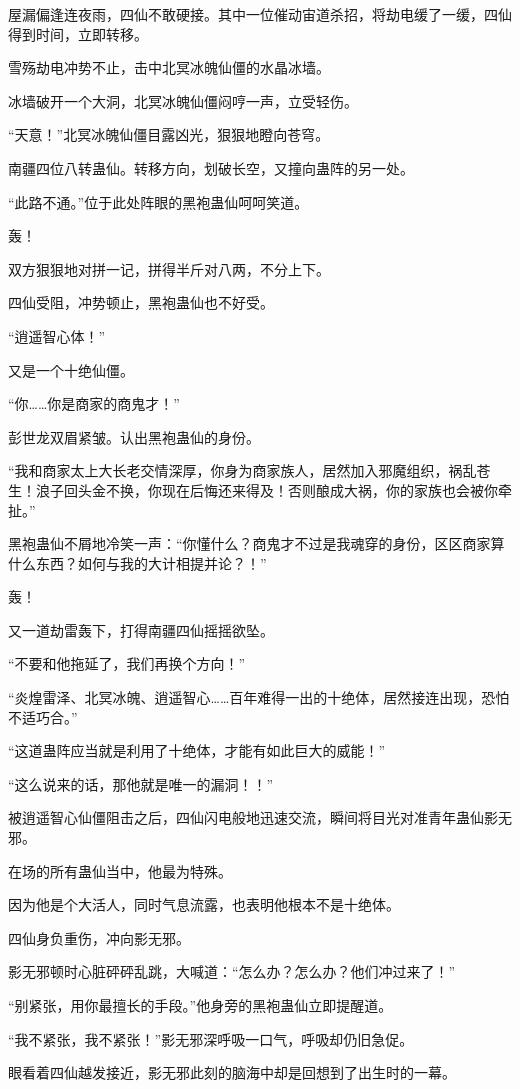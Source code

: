 \begin{this_body}
屋漏偏逢连夜雨，四仙不敢硬接。其中一位催动宙道杀招，将劫电缓了一缓，四仙得到时间，立即转移。

雪殇劫电冲势不止，击中北冥冰魄仙僵的水晶冰墙。

冰墙破开一个大洞，北冥冰魄仙僵闷哼一声，立受轻伤。

“天意！”北冥冰魄仙僵目露凶光，狠狠地瞪向苍穹。

南疆四位八转蛊仙。转移方向，划破长空，又撞向蛊阵的另一处。

“此路不通。”位于此处阵眼的黑袍蛊仙呵呵笑道。

轰！

双方狠狠地对拼一记，拼得半斤对八两，不分上下。

四仙受阻，冲势顿止，黑袍蛊仙也不好受。

“逍遥智心体！”

又是一个十绝仙僵。

“你……你是商家的商鬼才！”

彭世龙双眉紧皱。认出黑袍蛊仙的身份。

“我和商家太上大长老交情深厚，你身为商家族人，居然加入邪魔组织，祸乱苍生！浪子回头金不换，你现在后悔还来得及！否则酿成大祸，你的家族也会被你牵扯。”

黑袍蛊仙不屑地冷笑一声：“你懂什么？商鬼才不过是我魂穿的身份，区区商家算什么东西？如何与我的大计相提并论？！”

轰！

又一道劫雷轰下，打得南疆四仙摇摇欲坠。

“不要和他拖延了，我们再换个方向！”

“炎煌雷泽、北冥冰魄、逍遥智心……百年难得一出的十绝体，居然接连出现，恐怕不适巧合。”

“这道蛊阵应当就是利用了十绝体，才能有如此巨大的威能！”

“这么说来的话，那他就是唯一的漏洞！！”

被逍遥智心仙僵阻击之后，四仙闪电般地迅速交流，瞬间将目光对准青年蛊仙影无邪。

在场的所有蛊仙当中，他最为特殊。

因为他是个大活人，同时气息流露，也表明他根本不是十绝体。

四仙身负重伤，冲向影无邪。

影无邪顿时心脏砰砰乱跳，大喊道：“怎么办？怎么办？他们冲过来了！”

“别紧张，用你最擅长的手段。”他身旁的黑袍蛊仙立即提醒道。

“我不紧张，我不紧张！”影无邪深呼吸一口气，呼吸却仍旧急促。

眼看着四仙越发接近，影无邪此刻的脑海中却是回想到了出生时的一幕。


\end{this_body}
